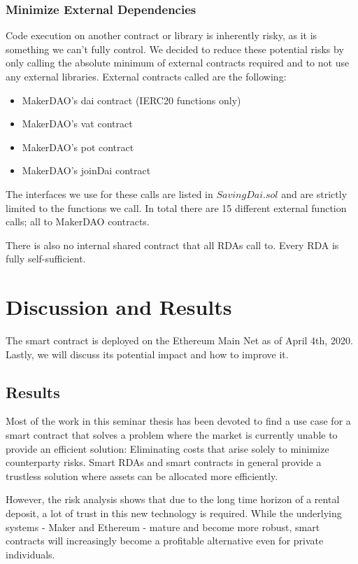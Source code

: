 \documentclass[12pt,a4paper,titlepage,oneside,english]{article}
\begin{document}
\subsubsection{Minimize External Dependencies}
Code execution on another contract or library is inherently risky, as it is something we can't fully control. We decided to reduce these potential risks by only calling the absolute minimum of external contracts required and to not use any external libraries. External contracts called are the following:

\begin{itemize}
	\item MakerDAO's dai contract (IERC20 functions only)
	\item MakerDAO's vat contract
	\item MakerDAO's pot contract
	\item MakerDAO's joinDai contract
\end{itemize}

The interfaces we use for these calls are listed in $SavingDai.sol$ and are strictly limited to the functions we call. In total there are 15 different external function calls; all to MakerDAO contracts.

There is also no internal shared contract that all RDAs call to. Every RDA is fully self-sufficient.


\section{Discussion and Results}

The smart contract is deployed on the Ethereum Main Net as of April 4th, 2020. Lastly, we will discuss its potential impact and how to improve it.

\subsection{Results}
Most of the work in this seminar thesis has been devoted to find a use case for a smart contract that solves a problem where the market is currently unable to provide an efficient solution: Eliminating costs that arise solely to minimize counterparty risks. Smart RDAs and smart contracts in general provide a trustless solution where assets can be allocated more efficiently.

However, the risk analysis shows that due to the long time horizon of a rental deposit, a lot of trust in this new technology is required. While the underlying systems - Maker and Ethereum - mature and become more robust, 
smart contracts will increasingly become a profitable alternative even for private individuals.
\end{document}
